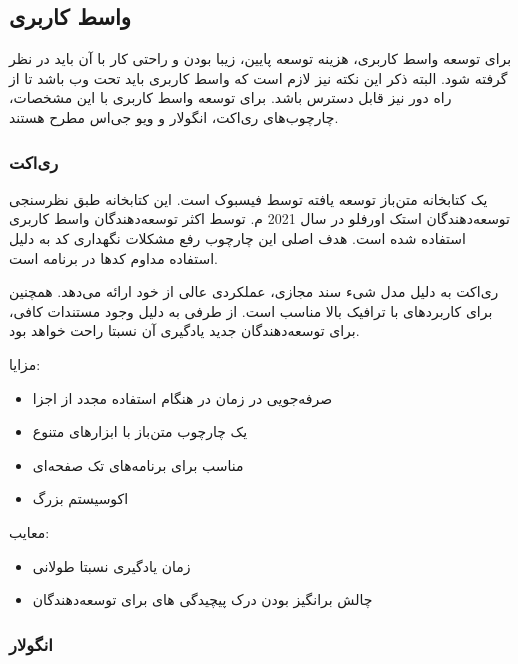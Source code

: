 \subsection{واسط کاربری}

برای توسعه واسط کاربری، هزینه توسعه پایین، زیبا بودن و راحتی کار با آن باید در نظر گرفته شود. البته ذکر این نکته نیز لازم است که واسط کاربری  باید تحت وب باشد تا از راه دور نیز قابل دسترس باشد. برای توسعه واسط کاربری با این مشخصات، چارچوب‌های ری‌اکت، انگولار و ویو جی‌اس مطرح هستند.

\newpage


\subsubsection{ری‌اکت}

یک کتابخانه متن‌باز توسعه یافته توسط فیسبوک است. این کتابخانه طبق نظرسنجی توسعه‌دهندگان استک اورفلو در سال 2021 م. توسط اکثر توسعه‌دهندگان واسط کاربری استفاده شده است. هدف اصلی این چارچوب رفع مشکلات نگهداری کد به دلیل استفاده مداوم کدها در برنامه است.


ری‌اکت به دلیل مدل شیء سند مجازی، عملکردی عالی از خود ارائه می‌دهد. همچنین برای کاربردهای با ترافیک بالا مناسب است. از طرفی به دلیل وجود مستندات کافی، برای توسعه‌دهندگان جدید یادگیری آن نسبتا راحت خواهد بود.



مزایا:
\begin{itemize}
    \item صرفه‌جویی در زمان در هنگام استفاده مجدد از اجزا
    \item یک چارچوب متن‌باز با ابزارهای متنوع
    \item مناسب برای برنامه‌های تک صفحه‌ای
    \item اکوسیستم بزرگ
\end{itemize}

معایب:

\begin{itemize}
    \item زمان یادگیری نسبتا طولانی
    \item چالش برانگیز بودن درک پیچیدگی های  برای توسعه‌دهندگان
\end{itemize}

\newpage

\subsubsection{انگولار}

